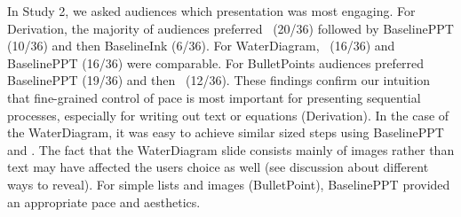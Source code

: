 In Study 2, we asked audiences which presentation was most engaging. For Derivation, the majority of audiences preferred \interface\ (20/36) followed by BaselinePPT (10/36) and then BaselineInk (6/36). For WaterDiagram, \interface\ (16/36) and BaselinePPT (16/36) were comparable. For BulletPoints audiences preferred BaselinePPT (19/36) and then \interface\ (12/36).
%
These findings confirm our intuition that fine-grained control of pace is most important for presenting sequential processes, especially for writing out text or equations (Derivation). In the case of the WaterDiagram, it was easy to achieve similar sized steps using BaselinePPT and \interface. The fact that the WaterDiagram slide consists mainly of images rather than text may have affected the users choice as well (see discussion about different ways to reveal). %
%
For simple lists and images (BulletPoint), BaselinePPT provided an appropriate pace and aesthetics.


